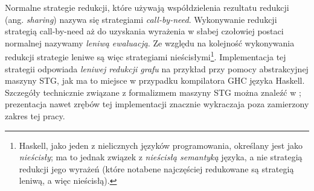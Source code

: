 Normalne strategie redukcji, które używają współdzielenia rezultatu redukcji (ang. \emph{sharing}) nazywa się strategiami \emph{call-by-need}. Wykonywanie redukcji strategią call-by-need aż do uzyskania wyrażenia w słabej czołowiej postaci normalnej nazywamy \emph{leniwą ewaluacją}. Ze względu na kolejność wykonywania redukcji strategie leniwe są więc strategiami nieścisłymi\footnote{Haskell, jako jeden z nielicznych języków programowania, określany jest jako \emph{nieścisły}; ma to jednak związek z \emph{nieścisłą semantyką} języka, a nie strategią redukcji jego wyrażeń (które notabene najczęściej redukowane są strategią leniwą, a więc nieścisłą).}. Implementacja tej strategii odpowiada \emph{leniwej redukcji grafu} \cite[Rozdział 12.1, str. 212]{PeytonJones:1987:IFP:1096899} na przykład przy pomocy abstrakcyjnej maszyny STG, jak ma to miejsce w przypadku kompilatora GHC języka Haskell. Szczegóły technicznie związane z formalizmem maszyny STG można znaleźć w \cite{jones1992implementing}; prezentacja nawet zrębów tej implementacji znacznie wykraczaja poza zamierzony zakres tej pracy. 

